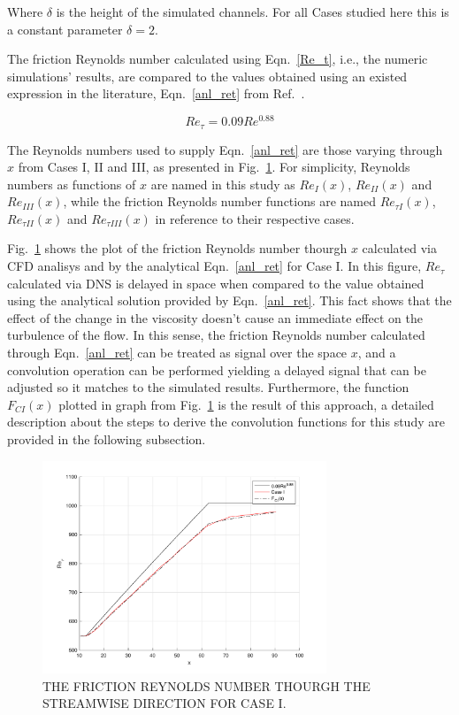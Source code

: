 \documentclass[twocolumn,10pt]{asme2e}
\begin{document}
Where \(\delta\) is the height of the simulated channels. For all Cases studied here this is a constant parameter \(\delta=2\).

The friction Reynolds number calculated using Eqn.~\ref{Re_t}, i.e., the numeric simulations' results, are compared to the values obtained using an existed expression in the literature, Eqn.~\ref{anl_ret} from Ref.~\cite{pope}.

\begin{equation}
Re_{\tau} = 0.09Re^{0.88}
\label{anl_ret}
\end{equation}

The Reynolds numbers used to supply Eqn.~\ref{anl_ret} are those varying through \(x\) from Cases I, II and III, as presented in Fig.~\ref{fig:re_t_x}. For simplicity, Reynolds numbers as functions of \(x\) are named in this study as \(Re_{I}(x)\), \(Re_{II}(x)\) and \(Re_{III}(x)\), while the friction Reynolds number functions are named \(Re_{{\tau}I}(x)\), \(Re_{{\tau}II}(x)\) and \(Re_{{\tau}III}(x)\) in reference to their respective cases.

Fig.~\ref{fig:re_t_x} shows the plot of the friction Reynolds number thourgh \(x\) calculated via CFD analisys and by the analytical Eqn.~\ref{anl_ret} for Case I. In this figure, \(Re_{\tau}\) calculated via DNS is delayed in space when compared to the value obtained using the analytical solution provided by Eqn.~\ref{anl_ret}. This fact shows that the effect of the change in the viscosity doesn't cause an immediate effect on the turbulence of the flow. In this sense, the friction Reynolds number calculated through Eqn.~\ref{anl_ret} can be treated as signal over the space \(x\), and a convolution operation can be performed yielding a delayed signal that can be adjusted so it matches to the simulated results. Furthermore, the function \(F_{CI}(x)\) plotted in graph from Fig.~\ref{fig:re_t_x} is the result of this approach, a detailed description about the steps to derive the convolution functions for this study are provided in the following subsection.

\begin{figure}[!htbp]
\begin{center}
\setlength{\unitlength}{0.012500in}%
  \includegraphics[trim = 20mm 15mm 20mm 10mm, width = 85mm]{convolution_CI.pdf}
\end{center}
  \caption{THE FRICTION REYNOLDS NUMBER THOURGH THE STREAMWISE DIRECTION FOR CASE I.}
  \label{fig:re_t_x}
\end{figure}
\end{document}
